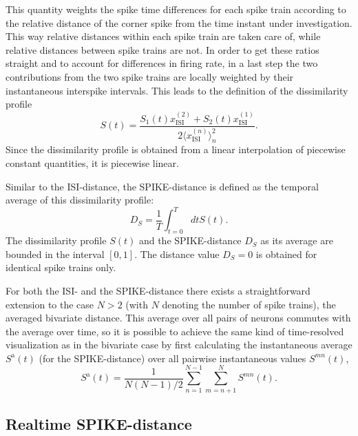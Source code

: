 \documentclass[10pt,twocolumn]{elsart5p}
\begin{document}
This quantity weights the spike time differences for each spike train according to the relative distance of the corner spike from the time instant under investigation. This way relative distances within each spike train are taken care of, while relative distances between spike trains are not. In order to get these ratios straight and to account for differences in firing rate, in a last step the two contributions from the two spike trains are locally weighted by their instantaneous interspike intervals. This leads to the definition of the dissimilarity profile
%
\begin{equation} \label{eq:Bi-Spike-Diss-Improved}
     S (t) = \frac{S_1 (t) x_{\mathrm {ISI}}^{(2)} + S_2 (t) x_{\mathrm {ISI}}^{(1)}}{2 \langle x_{\mathrm {ISI}}^{(n)} \rangle_n^2}.
\end{equation}
%
Since the dissimilarity profile is obtained from a linear interpolation of piecewise constant quantities, it is piecewise linear.

Similar to the ISI-distance, the SPIKE-distance is defined as the temporal average of this dissimilarity profile:
%
\begin{equation} \label{eq:Temporal-Average2}
    D_S = \frac{1}{T} \int_{t=0}^T dt S (t).
\end{equation}
%
The dissimilarity profile $S (t)$ and the SPIKE-distance $D_S$ as its average are bounded in the interval $[0, 1]$. The distance value $D_S = 0$ is obtained for identical spike trains only.
	
For both the ISI- and the SPIKE-distance there exists a straightforward extension to the case $N > 2$ (with $N$ denoting the number of spike trains), the averaged bivariate distance. This average over all pairs of neurons commutes with the average over time, so it is possible to achieve the same kind of time-resolved visualization as in the bivariate case by first calculating the instantaneous average $S^{\mathrm {a}} (t)$ (for the SPIKE-distance) over all pairwise instantaneous values $S^{mn} (t)$,
%
\begin{equation} \label{eq:Bivariate-Average}
    S^{\mathrm {a}} (t) = \frac{1}{N(N-1)/2}\sum_{n=1}^{N-1} \sum_{m=n+1}^N S^{mn} (t).
\end{equation}



\subsection{\label{ss:Realtime-Spike-Distance} Realtime SPIKE-distance}
\end{document}
